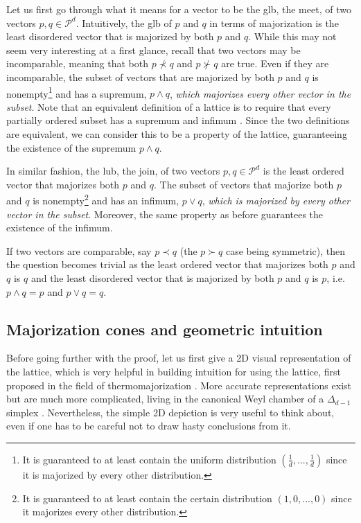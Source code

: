 Let us first go through what it means for a vector to be the glb, the meet, of two vectors $p, q \in \mathcal{P}^d$. Intuitively, the glb of $p$ and $q$ in terms of majorization is the least disordered vector that is majorized by both $p$ and $q$. While this may not seem very interesting at a first glance, recall that two vectors may be incomparable, meaning that both $p \nprec q$ and $p \nsucc q$ are true. Even if they are incomparable, the subset of vectors that are majorized by both $p$ and $q$ is nonempty\footnote{It is guaranteed to at least contain the uniform distribution $(\frac{1}{d}, ..., \frac{1}{d})$ since it is majorized by every other distribution.} and has a supremum, $p \wedge q$, \textit{which majorizes every other vector in the subset}. Note that an equivalent definition of a lattice is to require that every partially ordered subset has a supremum and infimum \cite[p. 19]{marshall_inequalities_2011}. Since the two definitions are equivalent, we can consider this to be a property of the lattice, guaranteeing the existence of the supremum $p \wedge q$.

In similar fashion, the lub, the join, of two vectors $p, q \in \mathcal{P}^d$ is the least ordered vector that majorizes both $p$ and $q$. The subset of vectors that majorize both $p$ and $q$ is nonempty\footnote{It is guaranteed to at least contain the certain distribution $(1, 0, ..., 0)$ since it majorizes every other distribution.} and has an infimum, $p \vee q$, \textit{which is majorized by every other vector in the subset}. Moreover, the same property as before guarantees the existence of the infimum.

\begin{corollary} \label{cor:comp_meet_join}
    If two vectors are comparable, say $p \prec q$ (the $p \succ q$ case being symmetric), then the question becomes trivial as the least ordered vector that majorizes both $p$ and $q$ is $q$ and the least disordered vector that is majorized by both $p$ and $q$ is $p$, i.e. $p \wedge q = p$ and $p \vee q = q$.
\end{corollary}



\subsection{Majorization cones and geometric intuition} \label{sec:majorization_cones}

Before going further with the proof, let us first give a 2D visual representation of the lattice, which is very helpful in building intuition for using the lattice, first proposed in the field of thermomajorization \cite{korzekwa_structure_2017}. More accurate representations exist but are much more complicated, living in the canonical Weyl chamber of a $\Delta_{d-1}$ simplex \cite{junior_geometric_2022}. Nevertheless, the simple 2D depiction is very useful to think about, even if one has to be careful not to draw hasty conclusions from it.

